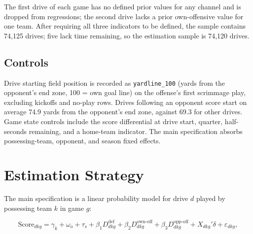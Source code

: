 \documentclass[11pt]{article}
\begin{document}
The first drive of each game has no defined prior values for any channel and
is dropped from regressions; the second drive lacks a prior own-offensive
value for one team. After requiring all three indicators to be defined, the
sample contains 74{,}125 drives; five lack time remaining, so the estimation
sample is 74{,}120 drives.

\subsection{Controls}

Drive starting field position is recorded as \texttt{yardline\_100} (yards
from the opponent's end zone, 100 = own goal line) on the offense's first
scrimmage play, excluding kickoffs and no-play rows. Drives following an
opponent score start on average 74.9 yards from the opponent's end zone,
against 69.3 for other drives. Game state controls
include the score differential at drive start, quarter, half-seconds
remaining, and a home-team indicator. The main specification absorbs
possessing-team, opponent, and season fixed effects.

\section{Estimation Strategy}\label{sec:strategy}

The main specification is a linear probability model for drive $d$ played
by possessing team $k$ in game $g$:

\begin{equation}\label{eq:main}
    \text{Score}_{dkg} = \gamma_k + \omega_{o} + \tau_{s} + \beta_1 D_{dkg}^{\text{def}} +
    \beta_2 D_{dkg}^{\text{own-off}} + \beta_3 D_{dkg}^{\text{opp-off}} +
    X_{dkg}'\delta + \varepsilon_{dkg},
\end{equation}
\end{document}
